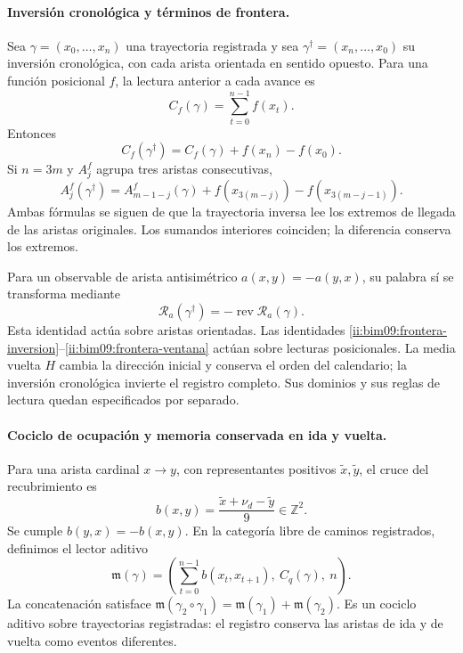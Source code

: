 \paragraph{Inversión cronológica y términos de frontera.}

Sea $\gamma=(x_0,\ldots,x_n)$ una trayectoria registrada y sea
$\gamma^\dagger=(x_n,\ldots,x_0)$ su inversión cronológica, con cada
arista orientada en sentido opuesto. Para una función posicional $f$,
la lectura anterior a cada avance es
\[
 C_f(\gamma)=\sum_{t=0}^{n-1}f(x_t).
\]
Entonces
\begin{equation}
 C_f(\gamma^\dagger)=C_f(\gamma)+f(x_n)-f(x_0).
 \label{ii:bim09:frontera-inversion}
\end{equation}
Si $n=3m$ y $A_j^f$ agrupa tres aristas consecutivas,
\begin{equation}
 A_j^f(\gamma^\dagger)=A_{m-1-j}^f(\gamma)
 +f(x_{3(m-j)})-f(x_{3(m-j-1)}).
 \label{ii:bim09:frontera-ventana}
\end{equation}
Ambas fórmulas se siguen de que la trayectoria inversa lee los extremos
de llegada de las aristas originales. Los sumandos interiores coinciden;
la diferencia conserva los extremos.

Para un observable de arista antisimétrico $a(x,y)=-a(y,x)$, su palabra
sí se transforma mediante
\[
 \mathcal R_a(\gamma^\dagger)
 =-\operatorname{rev}\mathcal R_a(\gamma).
\]
Esta identidad actúa sobre aristas orientadas. Las identidades
\eqref{ii:bim09:frontera-inversion}--\eqref{ii:bim09:frontera-ventana}
actúan sobre lecturas posicionales. La media vuelta $H$ cambia la
dirección inicial y conserva el orden del calendario; la inversión
cronológica invierte el registro completo. Sus dominios y sus reglas de
lectura quedan especificados por separado.

\paragraph{Cociclo de ocupación y memoria conservada en ida y vuelta.}

Para una arista cardinal $x\to y$, con representantes positivos
$\widetilde x,\widetilde y$, el cruce del recubrimiento es
\[
 b(x,y)=\frac{\widetilde x+\nu_d-\widetilde y}{9}\in\mathbb Z^2.
\]
Se cumple $b(y,x)=-b(x,y)$. En la categoría libre de caminos
registrados, definimos el lector aditivo
\begin{equation}
 \mathfrak m(\gamma)=
 \left(\sum_{t=0}^{n-1}b(x_t,x_{t+1}),\ C_q(\gamma),\ n\right).
 \label{ii:bim09:memoria-aditiva}
\end{equation}
La concatenación satisface
$\mathfrak m(\gamma_2\circ\gamma_1)=
\mathfrak m(\gamma_1)+\mathfrak m(\gamma_2)$.
Es un cociclo aditivo sobre trayectorias registradas: el registro conserva
las aristas de ida y de vuelta como eventos diferentes.

